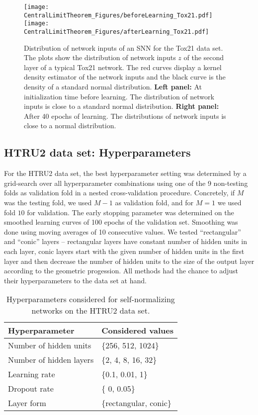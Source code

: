 \documentclass{article}
\begin{document}
\begin{figure}
 \texttt{[image: CentralLimitTheorem\_Figures/beforeLearning\_Tox21.pdf]}
 \texttt{[image: CentralLimitTheorem\_Figures/afterLearning\_Tox21.pdf]}
 \caption[Distribution of network inputs in Tox21 SNNs.]{Distribution of network inputs of an SNN for the Tox21 data set. 
  The plots show the distribution of network inputs $z$ of the second layer of a typical Tox21 network.
  The red curves display a kernel density estimator of the network inputs and the black curve is the 
  density of a standard normal distribution. 
  {\bf Left panel:} At initialization time before learning. The distribution of network inputs is close to a standard 
  normal distribution.
  {\bf Right panel:} After 40 epochs of learning. The distributions of network inputs is close to a normal distribution.
  \label{fig:clt}
 }
\end{figure}




\clearpage

\subsection{HTRU2 data set: Hyperparameters}
For the HTRU2 data set, the best hyperparameter setting was determined by a grid-search over all
hyperparameter combinations using one of the 9 non-testing folds as validation fold in a nested
cross-validation procedure. Concretely, 
if $M$ was the testing fold, we used $M-1$ as validation fold, and for $M=1$ we used fold $10$
for validation. The early stopping parameter was determined on the smoothed learning curves of 100 epochs 
of the validation set. Smoothing was done using moving averages of 10 consecutive 
values. We tested ``rectangular'' and ``conic'' layers -- rectangular layers have 
constant number of hidden units in each layer, conic layers start with the given 
number of hidden units in the first layer and then decrease the number of hidden units
to the size of the output layer according to the geometric progession.
All methods had the chance to adjust their hyperparameters to the data set at hand. 

\begin{table}[htp]
\begin{center}
\caption{Hyperparameters considered for self-normalizing networks on the HTRU2 data set.}
\begin{tabular}{ll}
\toprule
Hyperparameter  & Considered values \\ 
\midrule
  Number of hidden units & \{256, 512, 1024\} \\
  Number of hidden layers & \{2, 4, 8, 16, 32\} \\
  Learning rate & \{0.1, 0.01, 1\} \\
  Dropout rate & \{ 0, 0.05\}\\
  Layer form & \{rectangular, conic\} \\
\bottomrule
\end{tabular}
\end{center}
\end{table}
\end{document}
